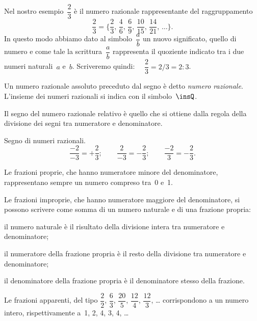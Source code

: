Nel nostro esempio~$\dfrac{2}{3}$ è il numero razionale rappresentante del raggruppamento
\[\frac{2}{3}=\bigg\lbrace\frac{2}{3}\text{,~}\frac{4}{6}\text{,~}\frac{6}{9}\text{,~}\frac{10}{15}\text{,~}\frac{14}{21}\text{,~}\ldots\bigg\rbrace.\]
In questo modo abbiamo dato al simbolo~$\dfrac{a}{b}$ un nuovo significato, quello di numero e come tale la
scrittura~$\dfrac{a}{b}$ rappresenta il quoziente indicato tra i due numeri naturali~$a$ e~$b$. Scriveremo quindi:~~
$ \dfrac{2}{3} = 2/3 = 2:3 $.

\begin{definizione}
Un numero razionale assoluto preceduto dal segno è detto \emph{numero razionale}.
L'insieme dei numeri razionali si indica con il simbolo~$\insQ$.
\end{definizione}

Il segno del numero razionale relativo è quello che si ottiene dalla regola della
divisione dei segni tra numeratore e denominatore.

\begin{exrig}
\begin{esempio}
Segno di numeri razionali.
\[\frac{-2}{-3}=+\frac{2}{3};\qquad\frac{2}{-3}=-\frac{2}{3};\qquad\frac{-2}{3}=-\frac{2}{3}.\]
\end{esempio}
\end{exrig}

Le frazioni proprie, che hanno numeratore minore del denominatore, rappresentano sempre un numero compreso tra~0 e~1.

\pagebreak

Le frazioni improprie, che hanno numeratore maggiore del denominatore, si possono scrivere come somma di un numero
naturale e di una frazione propria:
\begin{itemize*}
 \item il numero naturale è il risultato della divisione intera tra numeratore e denominatore;
 \item il numeratore della frazione propria è il resto della divisione tra numeratore e denominatore;
 \item il denominatore della frazione propria è il denominatore stesso della frazione.
\end{itemize*}

Le frazioni apparenti, del tipo
$\dfrac{2}{2}$, $\dfrac{6}{3}$, $\dfrac{20}{5}$, $\dfrac{12}{4}$, $\dfrac{12}{3}$, \ldots{}
corrispondono a un numero intero, rispettivamente a~1, 2, 4, 3, 4, \ldots{}


